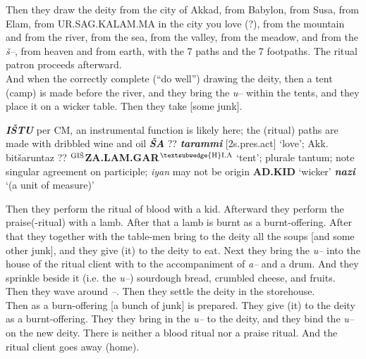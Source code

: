 \documentclass[10pt]{article}
\newcommand{\supersc}[1]{$^{\textrm{\scriptsize{#1}}}$}  	%
\newcommand{\bit}[1]{\textbf{\textit{#1}}}				%
\newcommand{\p}[1]{{\tiny[{#1}]}}					%
\newcommand{\hith}{\textsubwedge{h}}
\newcommand{\Hith}{\textsubwedge{H}}
\newcommand{\hpl}{\supersc{{\Hith}I.A}}
\newcommand{\wood}{\supersc{GI\v{S}}}
\renewcommand{\.}[1]{\textsubdot{#1}}
\begin{document}
\begin{description}
\begin{notes}
\end{notes}


\item[\S\S25--26 :] Then they draw the deity from the city of Akkad, from Babylon, from Susa, from Elam, from {\Hith}UR.SAG.KALAM.MA in the city you love (?), from the mountain and from the river, from the sea, from the valley, from the meadow, and from the \textit{\v{s}--}, from heaven and from earth, with the 7 paths and the 7 footpaths. The ritual patron proceeds afterward. \\

And when the correctly complete (``do well'') drawing the deity, then a tent (camp) is made before the river, and they bring the \textit{u}-- within the tents, and they place it on a wicker table. Then they take [some junk].

\begin{notes}
\bit{I\v{S}TU} per CM, an instrumental function is likely here; the (ritual) paths are made with dribbled wine and oil
\bit{\v{S}A} ?? \bit{tarammi} \p{2s.pres.act} `love'; Akk. bit{\v{s}aruntaz} ?? \textbf{{\wood}ZA.LAM.GAR{\hpl}} `tent'; plurale tantum; note singular agreement on participle; \textit{iyan} may not be origin \textbf{AD.KID} `wicker'
\bit{na{\hith}zi} `(a unit of measure)'

\end{notes}


\item[\S\S27--28 :] Then they perform the ritual of blood with a kid. Afterward they perform the praise(-ritual) with a lamb. After that a lamb is burnt as a burnt-offering. After that they together with the table-men bring to the deity all the soups [and some other junk], and they give (it) to the deity to eat. Next they bring the \textit{u--} into the house of the ritual client with to the accompaniment of \textit{a--} and a drum. And they sprinkle beside it (i.e. the \textit{u--}) sourdough bread, crumbled cheese, and fruits. Then they wave around \textit{{\hith}--}. Then they settle the deity in the storehouse.  \\

Then as a burn-offering [a bunch of junk] is prepared. They give (it) to the deity as a burnt-offering. They they bring in the \textit{u--} to the deity, and they bind the \textit{u--} on the new deity. There is neither a blood ritual nor a praise ritual. And the ritual client goes away (home).


\begin{notes}


\end{notes}
\end{description}
\end{document}
